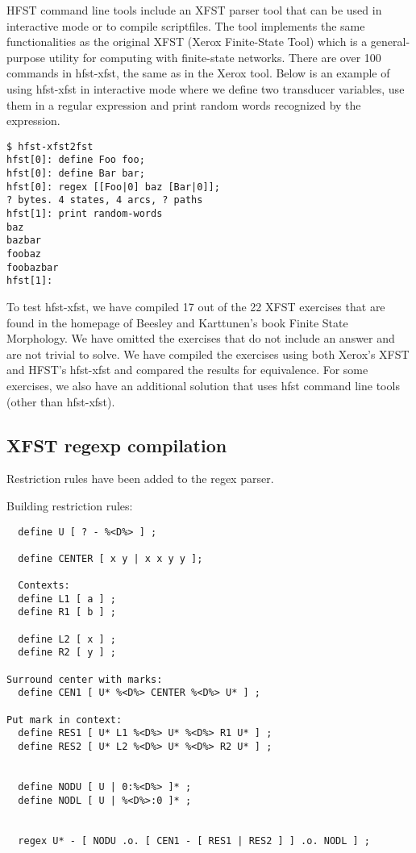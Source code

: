 \documentclass{llncs}
\begin{document}
HFST command line tools include an XFST parser tool that can be used
in interactive mode or to compile scriptfiles. The tool implements the
same functionalities as the original XFST (Xerox Finite-State Tool)
which is a general-purpose utility for computing with finite-state
networks. There are over 100 commands in hfst-xfst, the same as in the
Xerox tool. Below is an example of using hfst-xfst in interactive mode
where we define two transducer variables, use them in a regular
expression and print random words recognized by the expression.

\begin{verbatim}
$ hfst-xfst2fst 
hfst[0]: define Foo foo;
hfst[0]: define Bar bar;
hfst[0]: regex [[Foo|0] baz [Bar|0]];
? bytes. 4 states, 4 arcs, ? paths
hfst[1]: print random-words
baz
bazbar
foobaz
foobazbar
hfst[1]: 
\end{verbatim}

To test hfst-xfst, we have compiled 17 out of the 22 XFST exercises
that are found in the homepage of Beesley and Karttunen's book Finite
State Morphology. We have omitted the exercises that do not include an
answer and are not trivial to solve. We have compiled the exercises
using both Xerox's XFST and HFST's hfst-xfst and compared the results
for equivalence. For some exercises, we also have an additional
solution that uses hfst command line tools (other than hfst-xfst).

\subsection{XFST regexp compilation}

Restriction rules have been added to the regex parser.

Building restriction rules:

\begin{verbatim}
  define U [ ? - %<D%> ] ;

  define CENTER [ x y | x x y y ];

  Contexts:
  define L1 [ a ] ;
  define R1 [ b ] ;

  define L2 [ x ] ;
  define R2 [ y ] ;
  
Surround center with marks:
  define CEN1 [ U* %<D%> CENTER %<D%> U* ] ;

Put mark in context:
  define RES1 [ U* L1 %<D%> U* %<D%> R1 U* ] ;
  define RES2 [ U* L2 %<D%> U* %<D%> R2 U* ] ;
  
  
  define NODU [ U | 0:%<D%> ]* ;
  define NODL [ U | %<D%>:0 ]* ;

 
  regex U* - [ NODU .o. [ CEN1 - [ RES1 | RES2 ] ] .o. NODL ] ;
\end{verbatim}     
        
\end{document}
